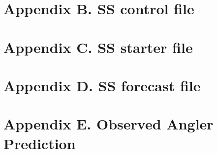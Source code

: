 \documentclass[12pt,]{article}
\begin{document}
\renewcommand{\thepage}{A1-\arabic{page}}
\renewcommand{\thefigure}{A1.\arabic{figure}}
\renewcommand{\thetable}{A1.\arabic{table}}

\setcounter{page}{1} \setcounter{figure}{1} \setcounter{table}{1}

\newpage

\section*{Appendix B. SS control
file}\label{appendix-b.-ss-control-file}

\renewcommand{\thepage}{B-\arabic{page}}
\renewcommand{\thefigure}{B\arabic{figure}}
\renewcommand{\thetable}{B\arabic{table}}

\setcounter{page}{1} \setcounter{figure}{1} \setcounter{table}{1}

\newpage

\section*{Appendix C. SS starter
file}\label{appendix-c.-ss-starter-file}

\renewcommand{\thepage}{C-\arabic{page}}
\renewcommand{\thefigure}{C\arabic{figure}}
\renewcommand{\thetable}{C\arabic{table}}

\setcounter{page}{1} \setcounter{figure}{1} \setcounter{table}{1}

\newpage

\section*{Appendix D. SS forecast
file}\label{appendix-d.-ss-forecast-file}

\renewcommand{\thepage}{D-\arabic{page}}
\renewcommand{\thefigure}{D\arabic{figure}}
\renewcommand{\thetable}{D\arabic{table}}

\setcounter{page}{1} \setcounter{figure}{1} \setcounter{table}{1}

\newpage

\section*{Appendix E. Observed Angler
Prediction}\label{appendix-e.-observed-angler-prediction}
\end{document}
